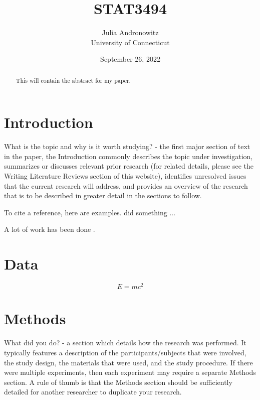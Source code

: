 \documentclass[12pt]{article}
\title{STAT3494}
\author{Julia Andronowitz\\
University of Connecticut}
\date{September 26, 2022}
\begin{document}
\maketitle

\begin{abstract}

This will contain the abstract for my paper.
\lipsum[2]

\end{abstract}

\section{Introduction}

What is the topic and why is it worth studying? - the first major section of text in the paper, the Introduction commonly describes the topic under investigation, summarizes or discusses relevant prior research (for related details, please see the Writing Literature Reviews section of this website), identifies unresolved issues that the current research will address, and provides an overview of the research that is to be described in greater detail in the sections to follow.

\lipsum[1]

To cite a reference, here are examples.
\citet{xie2015dynamic} did something ... \lipsum[4]

A lot of work has been done \citep[e.g.,][]{xie2015dynamic}.

\lipsum[2]

\section{Data}

\begin{equation}
  \label{eq:mc2}
  E= m c^2
\end{equation}

\lipsum[3]


\section{Methods}

What did you do? - a section which details how the research was performed.  It typically features a description of the participants/subjects that were involved, the study design, the materials that were used, and the study procedure.  If there were multiple experiments, then each experiment may require a separate Methods section.  A rule of thumb is that the Methods section should be sufficiently detailed for another researcher to duplicate your research.
\end{document}
